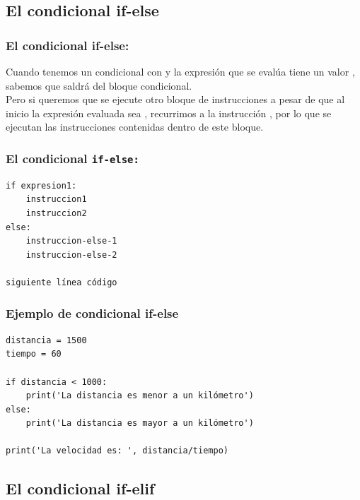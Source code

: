 \documentclass[12pt]{beamer}
\begin{document}
\subsection{El condicional if-else}

\begin{frame}
\frametitle{El condicional if-else:}
Cuando tenemos un condicional con  y la expresión que se evalúa tiene un valor , sabemos que saldrá del bloque condicional.
\\
\bigskip
\pause
Pero si queremos que se ejecute otro bloque de instrucciones a pesar de que al inicio la expresión evaluada sea , \pause recurrimos a la instrucción , por lo que se ejecutan las instrucciones contenidas dentro de este bloque.
\end{frame}
\begin{frame}[fragile]
\frametitle{El condicional \texttt{if-else:}}
\begin{verbatim}
if expresion1:
    instruccion1
    instruccion2
else:
    instruccion-else-1
    instruccion-else-2

siguiente línea código
\end{verbatim}
\end{frame}
\begin{frame}[fragile]
\frametitle{Ejemplo de condicional if-else}
\begin{lstlisting}[caption=La estructura condicional if-else]
distancia = 1500
tiempo = 60

if distancia < 1000:
    print('La distancia es menor a un kilómetro')
else:
    print('La distancia es mayor a un kilómetro')

print('La velocidad es: ', distancia/tiempo)
\end{lstlisting}
\end{frame}

\subsection{El condicional if-elif}
\end{document}
